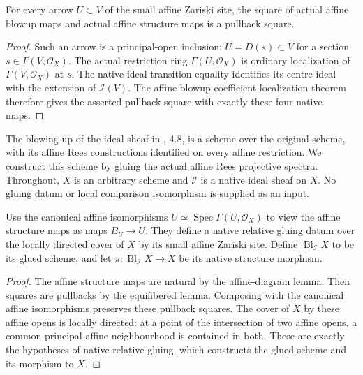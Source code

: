 \begin{lemma}
\label{lem:blowup-gluing-equifibered}
\leanok
For every arrow $U\subset V$ of the small affine Zariski site, the
square of actual affine blowup maps and actual affine structure maps
is a pullback square.
\end{lemma}
\begin{proof}
Such an arrow is a principal-open inclusion: $U=D(s)\subset V$ for a
section $s\in\Gamma(V,\mathcal O_X)$. The actual restriction ring
$\Gamma(U,\mathcal O_X)$ is ordinary localization of
$\Gamma(V,\mathcal O_X)$ at $s$. The native ideal-transition equality
identifies its centre ideal with the extension of $\mathcal I(V)$.
The affine blowup coefficient-localization theorem therefore gives
the asserted pullback square with exactly these four native maps.
\end{proof}

\endgroup

\begingroup

The blowing up of the ideal sheaf in \cite{deJong1996}, 4.8, is a
scheme over the original scheme, with its affine Rees constructions
identified on every affine restriction. We construct this scheme by
gluing the actual affine Rees projective spectra. Throughout, $X$ is
an arbitrary scheme and $\mathcal I$ is a native ideal sheaf on $X$.
No gluing datum or local comparison isomorphism is supplied as an input.

\begin{definition}
\label{def:global-native-blowup}
\leanok
Use the canonical affine isomorphisms
$U\simeq\operatorname{Spec}\Gamma(U,\mathcal O_X)$ to view the affine
structure maps as maps $B_U\to U$. They define a native relative
gluing datum over the locally directed cover of $X$ by its small
affine Zariski site. Define $\operatorname{Bl}_{\mathcal I}X$ to be
its glued scheme, and let $\pi:\operatorname{Bl}_{\mathcal I}X\to X$
be its native structure morphism.
\end{definition}
\begin{proof}
The affine structure maps are natural by the affine-diagram lemma.
Their squares are pullbacks by the equifibered lemma. Composing with
the canonical affine isomorphisms preserves these pullback squares.
The cover of $X$ by these affine opens is locally directed: at a
point of the intersection of two affine opens, a common principal
affine neighbourhood is contained in both. These are exactly the
hypotheses of native relative gluing, which constructs the glued
scheme and its morphism to $X$.
\end{proof}

